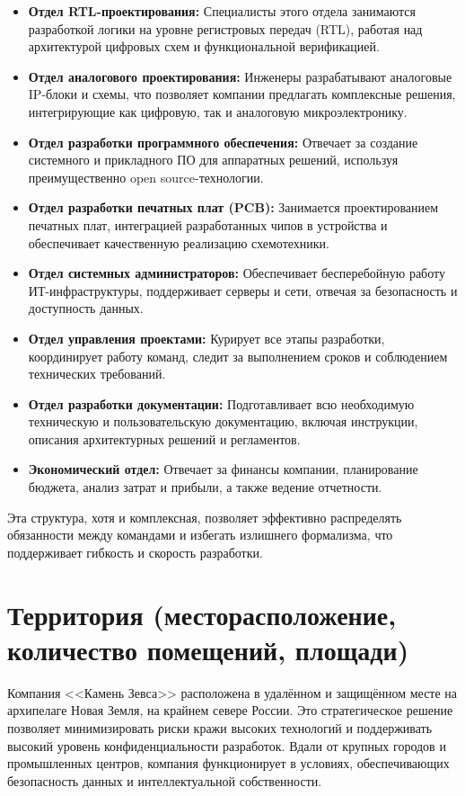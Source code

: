 \begin{itemize}
	\item \textbf{Отдел RTL-проектирования:}
		Специалисты этого отдела занимаются разработкой логики
		на уровне регистровых передач (RTL),
		работая над архитектурой цифровых схем и функциональной верификацией.
	\item \textbf{Отдел аналогового проектирования:}
		Инженеры разрабатывают аналоговые IP-блоки и схемы,
		что позволяет компании предлагать комплексные решения,
		интегрирующие как цифровую, так и аналоговую микроэлектронику.
	\item \textbf{Отдел разработки программного обеспечения:}
		Отвечает за создание системного
		и прикладного ПО для аппаратных решений,
		используя преимущественно open source-технологии.
	\item \textbf{Отдел разработки печатных плат (PCB):} Занимается
		проектированием печатных плат, интеграцией разработанных чипов
		в устройства и обеспечивает качественную реализацию схемотехники.
	\item \textbf{Отдел системных администраторов:}
		Обеспечивает бесперебойную работу ИТ-инфраструктуры,
		поддерживает серверы и сети,
		отвечая за безопасность и доступность данных.
	\item \textbf{Отдел управления проектами:}
		Курирует все этапы разработки,
		координирует работу команд,
		следит за выполнением сроков
		и соблюдением технических требований.
	\item \textbf{Отдел разработки документации:}
		Подготавливает всю необходимую техническую
		и пользовательскую документацию, включая инструкции,
		описания архитектурных решений и регламентов.
	\item \textbf{Экономический отдел:}
		Отвечает за финансы компании,
		планирование бюджета, анализ затрат и прибыли,
		а также ведение отчетности.
\end{itemize}

Эта структура, хотя и комплексная,
позволяет эффективно распределять обязанности между командами
и избегать излишнего формализма,
что поддерживает гибкость и скорость разработки.

\section{Территория (месторасположение, количество помещений, площади)}

Компания <<Камень Зевса>> расположена в удалённом
и защищённом месте на архипелаге Новая Земля, на крайнем севере России.
Это стратегическое решение позволяет минимизировать риски
кражи высоких технологий и поддерживать высокий уровень конфиденциальности
разработок. Вдали от крупных городов и промышленных центров,
компания функционирует в условиях, обеспечивающих безопасность данных
и интеллектуальной собственности.

